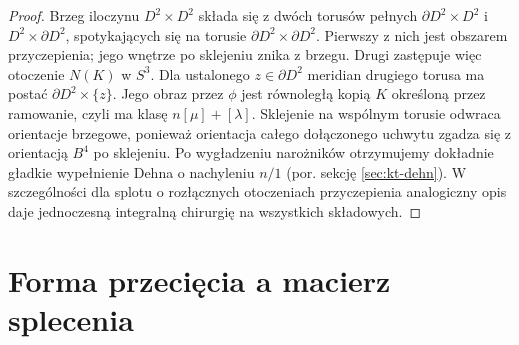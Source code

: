 \begin{proof}
Brzeg iloczynu $D^2\times D^2$ składa się z dwóch
torusów pełnych $\partial D^2\times D^2$ i
$D^2\times\partial D^2$, spotykających się na torusie
$\partial D^2\times\partial D^2$. Pierwszy z nich
jest obszarem przyczepienia; jego wnętrze po sklejeniu
znika z brzegu. Drugi zastępuje więc otoczenie $N(K)$
w $S^3$. Dla ustalonego $z\in\partial D^2$ meridian
drugiego torusa ma postać $\partial D^2\times\{z\}$.
Jego obraz przez $\phi$ jest równoległą kopią $K$
określoną przez ramowanie, czyli ma klasę
$n[\mu]+[\lambda]$. Sklejenie na wspólnym torusie
odwraca orientacje brzegowe, ponieważ orientacja
całego dołączonego uchwytu zgadza się z orientacją
$B^4$ po sklejeniu. Po wygładzeniu narożników
otrzymujemy dokładnie gładkie wypełnienie Dehna
o nachyleniu $n/1$ (por. sekcję \ref{sec:kt-dehn}).
W szczególności dla splotu o rozłącznych otoczeniach
przyczepienia analogiczny opis daje jednoczesną
integralną chirurgię na wszystkich składowych.
\end{proof}

\begin{center}
\end{center}

\section{Forma przecięcia a macierz splecenia}
\label{sec:kt-intersection}

